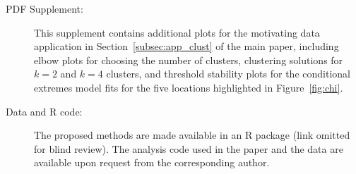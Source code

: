 \documentclass[12pt,compact]{article}
\begin{document}
\begin{description}

  \item[PDF Supplement:] This supplement contains additional plots for the motivating data application in Section~\ref{subsec:app_clust} of the main paper, including elbow plots for choosing the number of clusters, clustering solutions for $k=2$ and $k=4$ clusters, and threshold stability plots for the conditional extremes model fits for the five locations highlighted in Figure~\ref{fig:chi}.

  \item[Data and R code:] The proposed methods are made available in an R package (link omitted for blind review).
    The analysis code used in the paper and the data are available upon request from the corresponding author.

\end{description}


{\small


}

\clearpage
\end{document}

